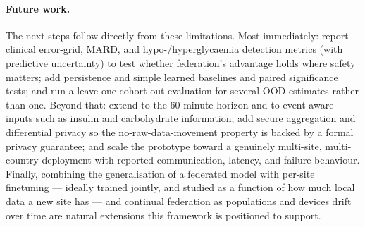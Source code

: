 \documentclass[10pt,letterpaper]{article}
\begin{document}
\paragraph{Future work.} The next steps follow directly from these limitations.
Most immediately: report clinical error-grid, MARD, and hypo-/hyperglycaemia
detection metrics (with predictive uncertainty) to test whether federation's
advantage holds where safety matters; add persistence and simple learned
baselines and paired significance tests; and run a leave-one-cohort-out
evaluation for several OOD estimates rather than one. Beyond that: extend to the
60-minute horizon and to event-aware inputs such as insulin and carbohydrate
information; add secure aggregation and differential privacy so the
no-raw-data-movement property is backed by a formal privacy guarantee; and scale
the prototype toward a genuinely multi-site, multi-country deployment with
reported communication, latency, and failure behaviour. Finally, combining the
generalisation of a federated model with per-site finetuning --- ideally trained
jointly, and studied as a function of how much local data a new site has --- and
continual federation as populations and devices drift over time are natural
extensions this framework is positioned to support.



\end{document}
